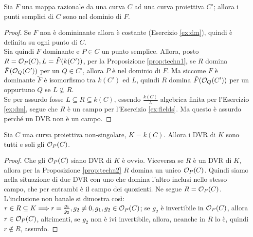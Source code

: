 \begin{comment}
            \ord(f) = \ord(\frac{g}{h}) = \ord(g) - \ord(h) = \ord(g) \geq 0
        \end{equation*}
        Allora $M_P(C_{n+1}) = \{f \in \cO_P(C_{n+1}) : f(P) = 0\}$, ma con le notazioni precedenti questo accade se e solo se $g(P) = 0 \iff g \in M \iff \ord(f) = \ord(g) > 0$. Questo prova che $R$ domina $\cO_P(C_{n+1}) = \cO_P(C)$.\\
        $P$ è unico, infatti $R$ dominasse anche $\cO_Q(C_{n+1}), Q \neq P$, allora, esiste $f \in k(C_{n+1})$ tale che $f \in M_P(C_{n+1}), \frac{1}{f} \in \cO_Q(C_{n+1})$, dunque $\ord(f) > 0,\ord(\frac{1}{f}) \geq 0$, assurdo. \\
        Una tale funzione esiste sempre perché: $f \in k(C_{n+1})$ è quoziente di elementi di $\gG(C_{n+1})$, quindi siccome $P,Q$ sono distinti esiste $f \in \gG(C_{n+1})$, che si annulla in $P$ e non in $Q$, quindi $f \in k(C_{n+1})$ è una tale funzione.
    \end{proof}
    \end{comment}
    \begin{corollario}
        Sia $F$ una mappa razionale da una curva $C$ ad una curva proiettiva $C'$; allora i punti semplici di $C$ sono nel dominio di $F$.
    \end{corollario}
    \begin{proof}
        Se $F$ non è domininante allora è costante (Esercizio \ref{ex:dm}), quindi è definita su ogni punto di $C$. \\
        Sia quindi $F$ dominante e $P \in C$ un punto semplice. Allora, posto $R = \mathcal{O}_P(C), L = \tilde{F}(k(C'))$, per la Proposizione \ref{prop:techn1}, se $R$ domina $\tilde{F}(\mathcal{O}_Q(C'))$ per un $Q \in C'$, allora $P$ è nel dominio di $F$. Ma siccome $F$ è dominante 
        $\tilde{F}$ è isomorfismo tra $k(C')$ ed $L$, quindi $R$ domina $\tilde{F}(\mathcal{O}_Q(C'))$ per un oppurtuno $Q$ se $L \not\subseteq R$. \\
        Se per assurdo fosse $L \subseteq R \subseteq k(C)$, essendo $\frac{k(C)}{L}$ algebrica finita per l'Esercizio \ref{ex:dm}, segue che $R$ è un campo per l'Esercizio \ref{ex:fields}. Ma questo è assurdo perché un DVR non è un campo.
    \end{proof}
    \begin{corollario}
        Sia $C$ una curva proiettiva non-singolare, $K = k(C)$. Allora i DVR di $K$ sono tutti e soli gli $\mathcal{O}_P(C)$.
    \end{corollario}
    \begin{proof}
        Che gli $\mathcal{O}_P(C)$ siano DVR di $K$ è ovvio. Viceversa se $R$ è un DVR di $K$, allora per la Proposizione \ref{prop:techn2} $R$ domina un unico $\mathcal{O}_P(C)$. Quindi siamo nella situazione di due DVR con uno che domina l'altro inclusi nello stesso campo, che per entrambi è il campo dei quozienti. 
        Ne segue $R = \mathcal{O}_P(C)$. L'inclusione non banale si dimostra così: $r \in R \subseteq K \Longrightarrow r = \frac{g_1}{g_2}, g_2 \neq 0, g_1,g_2 \in \mathcal{O}_P(C)$; se $g_2$ è invertibile in $\mathcal{O}_P(C)$, allora $r \in \mathcal{O}_P(C)$, altrimenti, se $g_2$ non è ivi invertibile, allora, neanche in $R$ lo 
        è, quindi $r \notin R$, assurdo.
    \end{proof}
